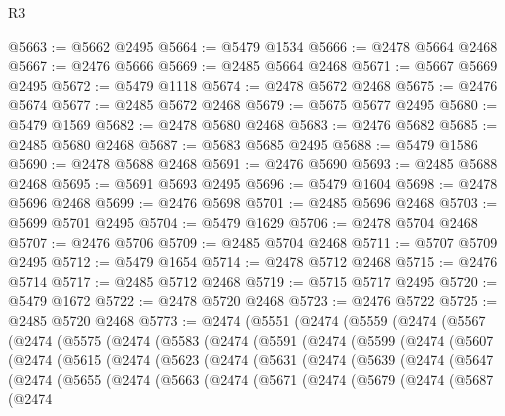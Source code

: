 \begin{lexlean}{R3}
\begin{coremodule}
@5663 := @5662 @2495
@5664 := @5479 @1534
@5666 := @2478 @5664 @2468
@5667 := @2476 @5666
@5669 := @2485 @5664 @2468
@5671 := @5667 @5669 @2495
@5672 := @5479 @1118
@5674 := @2478 @5672 @2468
@5675 := @2476 @5674
@5677 := @2485 @5672 @2468
@5679 := @5675 @5677 @2495
@5680 := @5479 @1569
@5682 := @2478 @5680 @2468
@5683 := @2476 @5682
@5685 := @2485 @5680 @2468
@5687 := @5683 @5685 @2495
@5688 := @5479 @1586
@5690 := @2478 @5688 @2468
@5691 := @2476 @5690
@5693 := @2485 @5688 @2468
@5695 := @5691 @5693 @2495
@5696 := @5479 @1604
@5698 := @2478 @5696 @2468
@5699 := @2476 @5698
@5701 := @2485 @5696 @2468
@5703 := @5699 @5701 @2495
@5704 := @5479 @1629
@5706 := @2478 @5704 @2468
@5707 := @2476 @5706
@5709 := @2485 @5704 @2468
@5711 := @5707 @5709 @2495
@5712 := @5479 @1654
@5714 := @2478 @5712 @2468
@5715 := @2476 @5714
@5717 := @2485 @5712 @2468
@5719 := @5715 @5717 @2495
@5720 := @5479 @1672
@5722 := @2478 @5720 @2468
@5723 := @2476 @5722
@5725 := @2485 @5720 @2468
@5773 := @2474
    (@5551
      (@2474
        (@5559
          (@2474
            (@5567
              (@2474
                (@5575
                  (@2474
                    (@5583
                      (@2474
                        (@5591
                          (@2474
                            (@5599
                              (@2474
                                (@5607
                                  (@2474
                                    (@5615
                                      (@2474
                                        (@5623
                                          (@2474
                                            (@5631
                                              (@2474
                                                (@5639
                                                  (@2474
                                                    (@5647
                                                      (@2474
                                                        (@5655
                                                          (@2474
                                                            (@5663
                                                              (@2474
                                                                (@5671
                                                                  (@2474
                                                                    (@5679
                                                                      (@2474
                                                                        (@5687
                                                                          (@2474

\end{coremodule}
\end{lexlean}

